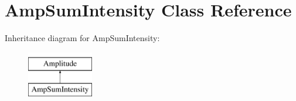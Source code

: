 \hypertarget{class_amp_sum_intensity}{\section{Amp\-Sum\-Intensity Class Reference}
\label{class_amp_sum_intensity}
}
Inheritance diagram for Amp\-Sum\-Intensity\-:\begin{figure}[H]
\begin{center}
\leavevmode
\includegraphics[height=2.000000cm]{class_amp_sum_intensity}
\end{center}
\end{figure}
